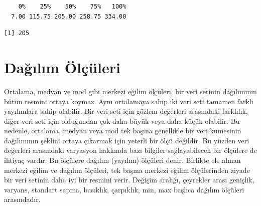 \documentclass[
  letterpaper,
  DIV=11,
  numbers=noendperiod]{scrreprt}
\newenvironment{Shaded}{\begin{snugshade}}{\end{snugshade}}
\newcommand{\AttributeTok}[1]{\textcolor[rgb]{0.40,0.45,0.13}{#1}}
\newcommand{\ConstantTok}[1]{\textcolor[rgb]{0.56,0.35,0.01}{#1}}
\newcommand{\FunctionTok}[1]{\textcolor[rgb]{0.28,0.35,0.67}{#1}}
\newcommand{\NormalTok}[1]{\textcolor[rgb]{0.00,0.23,0.31}{#1}}
\newcommand{\SpecialCharTok}[1]{\textcolor[rgb]{0.37,0.37,0.37}{#1}}
\begin{document}
\begin{Shaded}
\end{Shaded}

\begin{verbatim}
    0%    25%    50%    75%   100% 
  7.00 115.75 205.00 258.75 334.00 
\end{verbatim}

\begin{Shaded}
\end{Shaded}

\begin{verbatim}
[1] 205
\end{verbatim}

\hypertarget{daux11fux131lux131m-uxf6luxe7uxfcleri}{%
\section*{Dağılım
Ölçüleri}\label{daux11fux131lux131m-uxf6luxe7uxfcleri}}


Ortalama, medyan ve mod gibi merkezi eğilim ölçüleri, bir veri setinin
dağılımının bütün resmini ortaya koymaz. Aynı ortalamaya sahip iki veri
seti tamamen farklı yayılımlara sahip olabilir. Bir veri seti için
gözlem değerleri arasındaki farklılık, diğer veri seti için olduğundan
çok daha büyük veya daha küçük olabilir. Bu nedenle, ortalama, medyan
veya mod tek başına genellikle bir veri kümesinin dağılımının şeklini
ortaya çıkarmak için yeterli bir ölçü değildir. Bu yüzden veri değerleri
arasındaki varyasyon hakkında bazı bilgiler sağlayabilecek bir ölçülere
de ihtiyaç vardır. Bu ölçülere dağılım (yayılım) ölçüleri denir.
Birlikte ele alınan merkezi eğilim ve dağılım ölçüleri, tek başına
merkezi eğilim ölçülerinden ziyade bir veri setinin daha iyi bir resmini
verir. Değişim aralığı, çeyrekler arası genişlik, varyans, standart
sapma, basıklık, çarpıklık, min, max başlıca dağılım ölçüleri
arasındadır.
\end{document}
